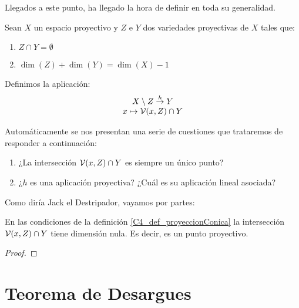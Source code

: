 Llegados a este punto, ha llegado la hora de definir  en toda su generalidad.
\begin{defi}
	\label{C4_def_proyeccionConica}
	Sean $X$ un espacio proyectivo y $Z$ e $Y$ dos variedades proyectivas de $X$ tales que:
	\begin{enumerate}
		\item $Z\cap Y=\emptyset$
		\item $\dim(Z)+\dim(Y)=\dim(X)-1$
	\end{enumerate}
	Definimos la aplicación:
	\[\begin{array}{c}
	X\setminus Z\stackrel{h}{\to} Y\\
	x\mapsto\mathcal{V}(x,Z)\cap Y
	\end{array}\]
\end{defi}
Automáticamente se nos presentan una serie de cuestiones que trataremos de responder a continuación:
\begin{enumerate}
	\item ¿La intersección $\mathcal{V}(x,Z)\cap Y$ es siempre un único punto?
	\item ¿$h$ es una aplicación proyectiva? ¿Cuál es su aplicación lineal asociada?
\end{enumerate}
Como diría Jack el Destripador, vayamos por partes:
\begin{prop}
	\label{C4_prop_interseccionUnipuntual}
	En las condiciones de la definición \ref{C4_def_proyeccionConica} la intersección $\mathcal{V}(x,Z)\cap Y$ tiene dimensión nula. Es decir, es un punto proyectivo.
\end{prop}
\begin{proof}
	
\end{proof}
\section{Teorema de Desargues}